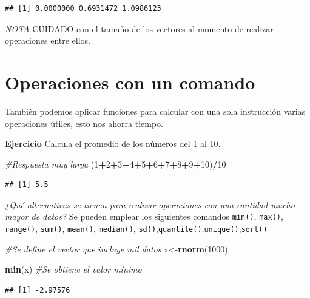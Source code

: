 \documentclass[
]{book}
\newenvironment{Shaded}{\begin{snugshade}}{\end{snugshade}}
\newcommand{\CommentTok}[1]{\textcolor[rgb]{0.56,0.35,0.01}{\textit{#1}}}
\newcommand{\DecValTok}[1]{\textcolor[rgb]{0.00,0.00,0.81}{#1}}
\newcommand{\FunctionTok}[1]{\textcolor[rgb]{0.13,0.29,0.53}{\textbf{#1}}}
\newcommand{\NormalTok}[1]{#1}
\newcommand{\OtherTok}[1]{\textcolor[rgb]{0.56,0.35,0.01}{#1}}
\newcommand{\SpecialCharTok}[1]{\textcolor[rgb]{0.81,0.36,0.00}{\textbf{#1}}}
\begin{document}
\begin{verbatim}
## [1] 0.0000000 0.6931472 1.0986123
\end{verbatim}

\emph{NOTA} CUIDADO con el tamaño de los vectores al momento de realizar operaciones entre ellos.

\section{Operaciones con un comando}\label{operaciones-con-un-comando}

También podemos aplicar funciones para calcular con una sola instrucción varias operaciones útiles, esto nos ahorra tiempo.

\textbf{Ejercicio} Calcula el promedio de los números del 1 al 10.

\begin{Shaded}
\begin{Highlighting}[]
\CommentTok{\#Respuesta muy larga }
\NormalTok{(}\DecValTok{1}\SpecialCharTok{+}\DecValTok{2}\SpecialCharTok{+}\DecValTok{3}\SpecialCharTok{+}\DecValTok{4}\SpecialCharTok{+}\DecValTok{5}\SpecialCharTok{+}\DecValTok{6}\SpecialCharTok{+}\DecValTok{7}\SpecialCharTok{+}\DecValTok{8}\SpecialCharTok{+}\DecValTok{9}\SpecialCharTok{+}\DecValTok{10}\NormalTok{)}\SpecialCharTok{/}\DecValTok{10}
\end{Highlighting}
\end{Shaded}

\begin{verbatim}
## [1] 5.5
\end{verbatim}

\emph{¿Qué alternativas se tienen para realizar operaciones con una cantidad mucho mayor de datos?} Se pueden emplear los siguientes comandos \texttt{min()}, \texttt{max()}, \texttt{range()}, \texttt{sum()}, \texttt{mean()}, \texttt{median()}, \texttt{sd()},\texttt{quantile()},\texttt{unique()},\texttt{sort()}

\begin{Shaded}
\begin{Highlighting}[]
\CommentTok{\#Se define el vector que incluye mil datos}
\NormalTok{x}\OtherTok{\textless{}{-}}\FunctionTok{rnorm}\NormalTok{(}\DecValTok{1000}\NormalTok{)}

\FunctionTok{min}\NormalTok{(x) }\CommentTok{\#Se obtiene el valor mínimo}
\end{Highlighting}
\end{Shaded}

\begin{verbatim}
## [1] -2.97576
\end{verbatim}
\end{document}
